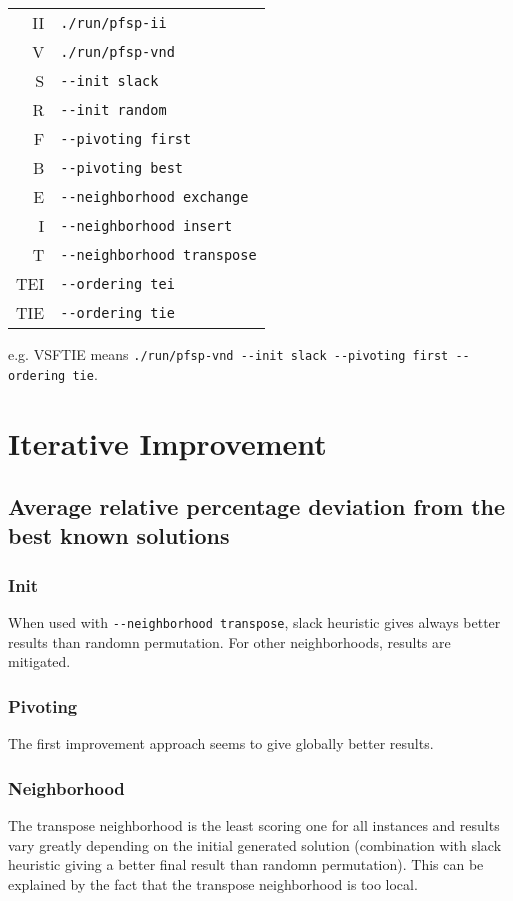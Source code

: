 \documentclass[a4paper,12pt]{article}
\begin{document}
\begin{tabular}{rl}
II & \verb!./run/pfsp-ii!\\
V  & \verb!./run/pfsp-vnd!\\
S  & \verb!--init slack!\\
R  & \verb!--init random!\\
F  & \verb!--pivoting first!\\
B  & \verb!--pivoting best!\\
E  & \verb!--neighborhood exchange!\\
I  & \verb!--neighborhood insert!\\
T  & \verb!--neighborhood transpose!\\
TEI  & \verb!--ordering tei!\\
TIE  & \verb!--ordering tie!\\
\end{tabular}

e.g. VSFTIE means \verb!./run/pfsp-vnd --init slack --pivoting first --ordering tie!.
\newpage\cleardoublepage{}
\section{Iterative Improvement}

\subsection{Average relative percentage deviation from the best known solutions}

\subsubsection{Init}

When used with \verb!--neighborhood transpose!, slack heuristic gives always better results than randomn permutation. For other neighborhoods, results are mitigated.

\subsubsection{Pivoting}

The first improvement approach seems to give globally better results.

\subsubsection{Neighborhood}

The transpose neighborhood is the least scoring one for all instances and results vary greatly depending on the initial generated solution (combination with slack heuristic giving a better final result than randomn permutation). This can be explained by the fact that the transpose neighborhood is too local.
\end{document}
